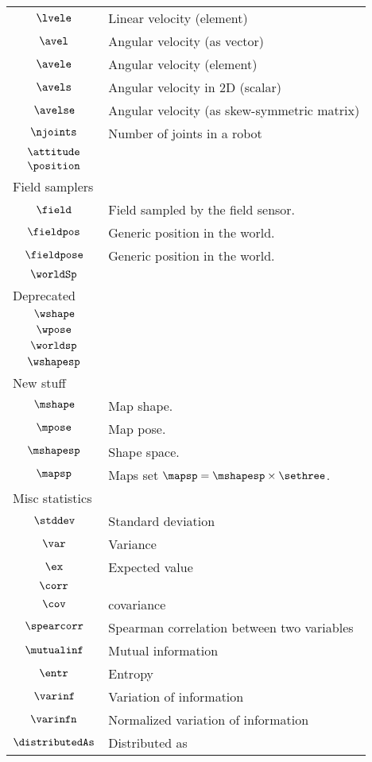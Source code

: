 \begin{longtable}{cl}
 $\lvele$ &  Linear velocity (element)\\ 
 $\avel$ &  Angular velocity (as vector)\\ 
 $\avele$ &  Angular velocity (element)\\ 
 $\avels$ &  Angular velocity in 2D (scalar)\\ 
 $\avelse$ &  Angular velocity (as skew-symmetric matrix)\\ 
 $\njoints$ &  Number of joints in a robot\\ 
 $\attitude$ & \\ 
 $\position$ & \\ 
 \multicolumn{2}{l}{Field samplers}\\ 
 \hline
$\field$ &  Field sampled by the field sensor.\\ 
 $\fieldpos$ &  Generic position in the world.\\ 
 $\fieldpose$ &  Generic position in the world.\\ 
 $\worldSp$ & \\ 
 \multicolumn{2}{l}{Deprecated}\\ 
 \hline
$\wshape$ & \\ 
 $\wpose$ & \\ 
 $\worldsp$ & \\ 
 $\wshapesp$ & \\ 
 \multicolumn{2}{l}{New stuff}\\ 
 \hline
$\mshape$ &  Map shape.\\ 
 $\mpose$ &  Map pose.\\ 
 $\mshapesp$ &  Shape space.\\ 
 $\mapsp$ &  Maps set $\mapsp = \mshapesp \times \sethree$.\\ 
 \multicolumn{2}{l}{Misc statistics}\\ 
 \hline
$\stddev$ &  Standard deviation\\ 
 $\var$ &  Variance\\ 
 $\ex$ &  Expected value\\ 
 $\corr$ & \\ 
 $\cov$ &  covariance\\ 
 $\spearcorr$ &  Spearman correlation between two variables\\ 
 $\mutualinf$ &  Mutual information\\ 
 $\entr$ &  Entropy\\ 
 $\varinf$ &  Variation of information\\ 
 $\varinfn$ &  Normalized variation of information\\ 
 $\distributedAs$ &  Distributed as\\ 

\end{longtable}

